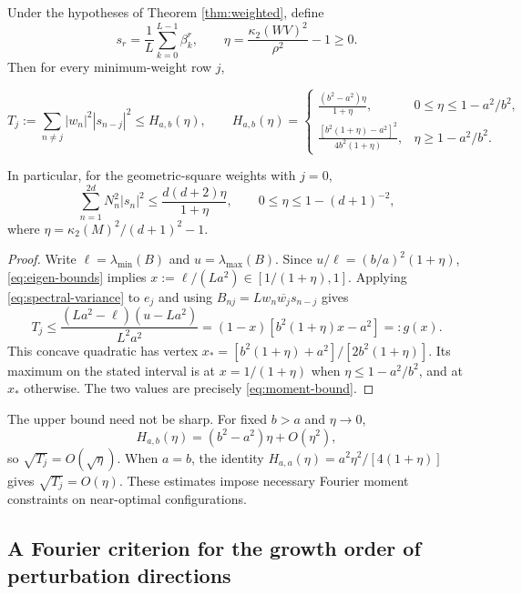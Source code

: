 \documentclass[10pt,twoside,final]{siamart1116}
\numberwithin{equation}{section}
\numberwithin{theorem}{section}
\newcommand{\cond}{\kappa_2}
\begin{document}
\begin{proposition}
\label{prop:near}
Under the hypotheses of Theorem \ref{thm:weighted}, define
\[
s_r=\frac1L\sum_{k=0}^{L-1}\beta_k^r,\qquad
\eta=\frac{\cond(WV)^2}{\rho^2}-1\ge0.
\]
Then for every minimum-weight row $j$,

\begin{equation}\label{eq:moment-bound}
T_j:=\sum_{n\ne j}|w_n|^2|s_{n-j}|^2\le H_{a,b}(\eta),\qquad
H_{a,b}(\eta)=\begin{cases}
\displaystyle\frac{(b^2-a^2)\eta}{1+\eta},&0\le\eta\le1-a^2/b^2,\\[6pt]
\displaystyle\frac{[b^2(1+\eta)-a^2]^2}{4b^2(1+\eta)},&\eta\ge1-a^2/b^2.
\end{cases}
\end{equation}

In particular, for the geometric-square weights with $j=0$,
\begin{equation}\label{eq:triangle-moment}
\sum_{n=1}^{2d}N_n^2|s_n|^2
\le\frac{d(d+2)\eta}{1+\eta},\qquad 0\le\eta\le1-(d+1)^{-2},
\end{equation}
where $\eta=\cond(M)^2/(d+1)^2-1$.
\end{proposition}
\begin{proof}
Write $\ell=\lambda_{\min}(B)$ and $u=\lambda_{\max}(B)$. Since
$u/\ell=(b/a)^2(1+\eta)$, \eqref{eq:eigen-bounds} implies
$x:=\ell/(La^2)\in[1/(1+\eta),1]$. Applying \eqref{eq:spectral-variance}
to $e_j$ and using $B_{nj}=Lw_n\overline{w_j}s_{n-j}$ gives
\[
T_j\le\frac{(La^2-\ell)(u-La^2)}{L^2a^2}
=(1-x)[b^2(1+\eta)x-a^2]=:g(x).
\]
This concave quadratic has vertex
$x_*=[b^2(1+\eta)+a^2]/[2b^2(1+\eta)]$. Its maximum on the stated interval
is at $x=1/(1+\eta)$ when $\eta\le1-a^2/b^2$, and at $x_*$ otherwise.
The two values are precisely \eqref{eq:moment-bound}.
\end{proof}

The upper bound need not be sharp. For fixed $b>a$ and $\eta\to0$,
\[
H_{a,b}(\eta)=(b^2-a^2)\eta+O(\eta^2),
\]
so $\sqrt{T_j}=O(\sqrt{\eta})$. When $a=b$, the identity
$H_{a,a}(\eta)=a^2\eta^2/[4(1+\eta)]$ gives $\sqrt{T_j}=O(\eta)$.
These estimates impose necessary Fourier moment constraints on near-optimal
configurations.

\subsection{A Fourier criterion for the growth order of perturbation directions}
\end{document}
